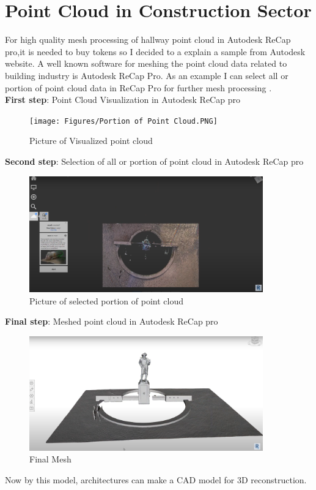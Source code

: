 \section{Point Cloud in Construction Sector}
For high quality mesh processing of hallway point cloud in Autodesk ReCap pro,it is needed to buy tokens so I decided to a explain a sample from Autodesk website.  A well known software for meshing the point cloud data related to building industry is Autodesk ReCap Pro. As an example I can select all or portion of point cloud data in ReCap Pro for further mesh processing \cite{ReCap}. \\

\noindent \textbf{First step}: Point Cloud Visualization in Autodesk ReCap pro
\begin{figure}[H]
  \centering
  \texttt{[image: Figures/Portion of Point Cloud.PNG]}
  \caption[Picture of Visualized Point Cloud]{Picture of Visualized point cloud}
\end{figure}

\noindent \textbf{Second step}: Selection of all or portion of point cloud in Autodesk ReCap pro
\begin{figure}[H]
  \centering
  \includegraphics[width= 0.9\textwidth]{Figures/Mesh option.PNG}
  \caption[Portion of selectded Point Cloud]{Picture of selected portion of point cloud }
\end{figure}
\noindent \textbf{Final step}: Meshed point cloud in Autodesk ReCap pro
\begin{figure}[H]
  \centering
  \includegraphics[width= 0.9\textwidth]{Figures/Finalmesh.PNG}
  \caption[Final Mesh]{Final Mesh}
\end{figure}
\noindent Now by this model, architectures can make a CAD model for 3D reconstruction.
